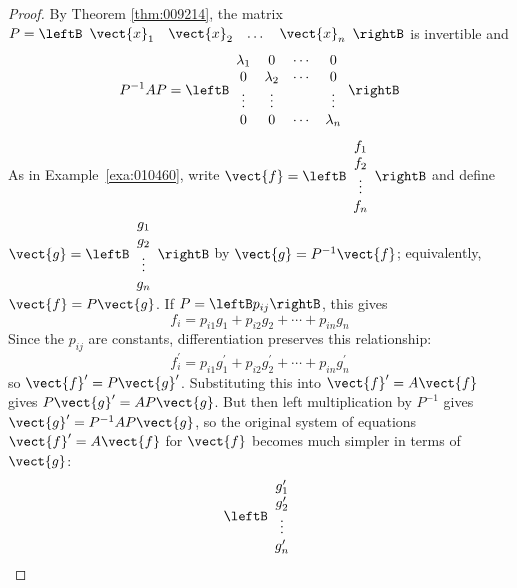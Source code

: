 \begin{proof}
By Theorem \ref{thm:009214}, the matrix $P = \leftB \begin{array}{cccc} \vect{x}_{1} &  \vect{x}_{2} & \dots & \vect{x}_{n} \end{array} \rightB$ is invertible and
\begin{equation*}
P^{-1}AP = \leftB \begin{array}{cccc}
\lambda_1 & 0 & \cdots & 0 \\
0 & \lambda_2 & \cdots & 0 \\
\vdots & \vdots & & \vdots \\
0 & 0 & \cdots & \lambda_n
\end{array}\rightB
\end{equation*}
As in Example~\ref{exa:010460}, write $\vect{f} = \leftB \begin{array}{c}
f_1\\
f_2\\
\vdots \\
f_n
\end{array}\rightB$
 and define $\vect{g} = \leftB \begin{array}{c}
g_1\\
g_2\\
\vdots \\
g_n
\end{array}\rightB$
 by $\vect{g} = P^{-1}\vect{f}$; equivalently, $\vect{f} = P\vect{g}$. If $P = \leftB p_{ij}\rightB$, this gives
\begin{equation*}
f_i = p_{i1}g_1 + p_{i2}g_2 + \cdots + p_{in}g_n
\end{equation*}
Since the $p_{ij}$ are constants, differentiation preserves this relationship:
\begin{equation*}
f_i^{\prime} = p_{i1}g_1^{\prime} + p_{i2}g_2^{\prime} + \cdots + p_{in}g_n^{\prime}
\end{equation*}
so $\vect{f}^{\prime} = P\vect{g}^{\prime}$. Substituting this into $\vect{f}^{\prime} = A\vect{f}$ gives $P\vect{g}^{\prime} = AP\vect{g}$. But then left multiplication by $P^{-1}$ gives $\vect{g}^{\prime} = P^{-1}AP\vect{g}$, so the original system of equations $\vect{f}^{\prime} = A\vect{f}$ for $\vect{f}$ becomes much simpler in terms of $\vect{g}$:
\begin{equation*}
 \leftB \begin{array}{c}
g_1^{\prime}\\
g_2^{\prime}\\
\vdots \\
g_n^{\prime}

\end{array}
\end{equation*}
\end{proof}
